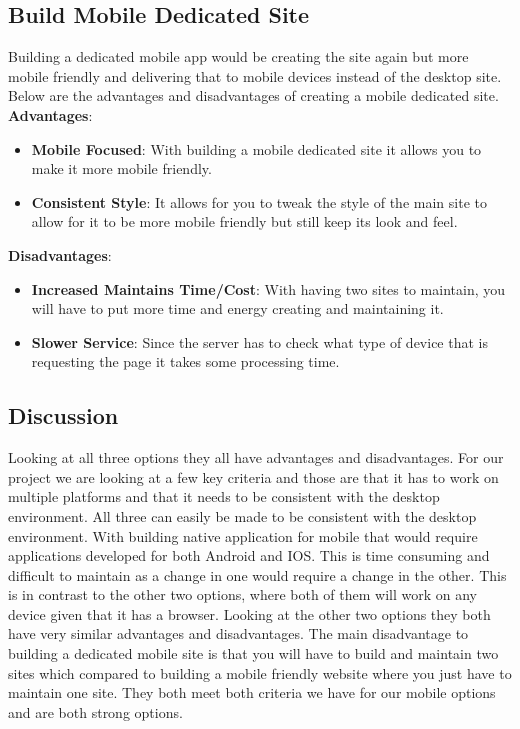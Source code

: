 \documentclass[onecolumn, draftclsnofoot,10pt, compsoc]{IEEEtran}
\begin{document}
		\subsection{Build Mobile Dedicated Site}
		Building a dedicated mobile app would be creating the site again but more
		mobile friendly and delivering that to mobile devices instead of the desktop
		site. Below are the advantages and disadvantages of creating a mobile dedicated site.
		\textbf{Advantages}:
		\begin{itemize}
			\item \textbf{Mobile Focused}: With building a mobile dedicated site it allows
			you to make it more mobile friendly.
			\item \textbf{Consistent Style}: It allows for you to tweak the style of the
			main site to allow for it to be more mobile friendly but still keep its look
			and feel.
		\end{itemize}
		\textbf{Disadvantages}:
		\begin{itemize}
			\item \textbf{Increased Maintains Time/Cost}: With having two sites to maintain,
			you will have to put more time and energy creating and maintaining it.
			\item \textbf{Slower Service}: Since the server has to check what type of
			device that is requesting the page it takes some processing time.
		\end{itemize}
		\subsection{Discussion}
		Looking at all three options they all have advantages and disadvantages. For
		our project we are looking at a few key criteria and those are that it has to
		work on multiple platforms and that it needs to be consistent with the desktop
		environment. All three can easily be made to be consistent with the desktop
		environment. With building native application for mobile that would require
		applications developed for both Android and IOS. This is time consuming and
		difficult to maintain as a change in one would require a change in the other.
		This is in contrast to the other two options, where both of them will work on any device
		given that it has a browser. Looking at the other two options they both have very
		similar advantages and disadvantages. The main disadvantage to building a dedicated
		mobile site is that you will have to build and maintain two sites which compared to
		building a mobile friendly website where you just have to maintain one site.
		They both meet both criteria we have for our mobile options and are both strong
		options.
\end{document}
